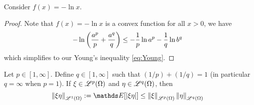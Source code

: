 \begin{hint}
Consider $f(x) = -\ln x$.
\end{hint}

\begin{proof}
Note that $f(x) = -\ln x$ is a convex function for all $x > 0$, we have
\begin{equation*}
    -\ln\left( \frac{a^p}{p} + \frac{a^q}{q} \right) \leq -\frac{1}{p} \ln a^p - \frac{1}{q} \ln b^q
\end{equation*}
which simplifies to our Young's inequality \eqref{eq:Young}.
\end{proof}

\begin{proposition}
Let $p \in [1,\infty]$. Define $q \in [1,\infty]$ such that $(1/p)+(1/q) = 1$ (in particular $q = \infty$ when $p = 1$). If $\xi \in \mathcal{L}^p(\Omega)$ and $\eta \in \mathcal{L}^q(\Omega)$, then
\begin{equation} \label{eq:Holder}
    \norm{\xi \eta}_{\L^1(\Omega)} := \E[|\xi \eta|] \leq \norm{\xi}_{\L^p(\Omega)} \norm{\eta}_{\L^q(\Omega)}
\end{equation}
\end{proposition}

